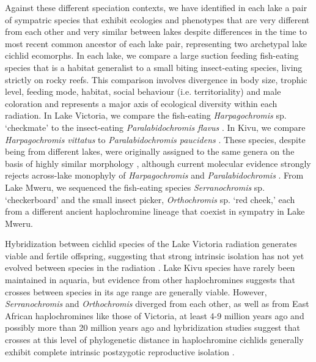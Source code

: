 Against these different speciation contexts, we have identified in each lake a pair of sympatric species that exhibit ecologies and phenotypes that are very different from each other and very similar between lakes despite differences in the time to most recent common ancestor of each lake pair, representing two archetypal lake cichlid ecomorphs. In each lake, we compare a large suction feeding fish-eating species that is a habitat generalist to a small biting insect-eating species, living strictly on rocky reefs. This comparison involves divergence in body size, trophic level, feeding mode, habitat, social behaviour (i.e. territoriality) and male coloration and represents a major axis of ecological diversity within each radiation. In Lake Victoria, we compare the fish-eating {\em Harpagochromis} sp. `checkmate' to the insect-eating {\em Paralabidochromis flavus} \cite{seehausen1998mbipi}. In Kivu, we compare {\em Harpagochromis vittatus} to {\em Paralabidochromis paucidens} \cite{snoeks1994haplochromines}. These species, despite being from different lakes, were originally assigned to the same genera on the basis of highly similar morphology \cite{greenwood1979towards}, although current molecular evidence strongly rejects across-lake monophyly of {\em Harpagochromis} and {\em Paralabidochromis} \cite{bezault2011population}. From Lake Mweru, we sequenced the fish-eating species {\em Serranochromis} sp. `checkerboard' and the small insect picker, {\em Orthochromis} sp. `red cheek,' each from a different ancient haplochromine lineage that coexist in sympatry in Lake Mweru.

Hybridization between cichlid species of the Lake Victoria radiation generates viable and fertile offspring, suggesting that strong intrinsic isolation has not yet evolved between species in the radiation \cite{stelkens2009genetic, stelkens2015hybrid}. Lake Kivu species have rarely been maintained in aquaria, but evidence from other haplochromines suggests that crosses between species in its age range are generally viable. However, {\em Serranochromis}  and {\em Orthochromis} diverged from each other, as well as from East African haplochromines like those of Victoria, at least 4-9 million years ago \cite{genner2007age, friedman2013molecular} and possibly more than 20 million years ago \cite{genner2007age, wagner2012ecological, schwarzer2012repeated} and hybridization studies suggest that crosses at this level of phylogenetic distance in haplochromine cichlids generally exhibit complete intrinsic postzygotic reproductive isolation \cite{stelkens2009genetic, stelkens2015hybrid}.

